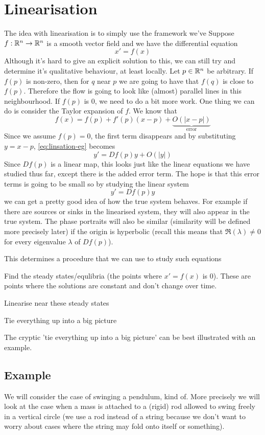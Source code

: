 \section{Linearisation}
The idea with linearisation is to simply use the framework we've 
Suppose $f: \mathbb{R}^n \to \mathbb{R}^n$ is a smooth vector field and we have the differential equation
\begin{equation}\label{eq:linsation-eg}
    x' = f(x)
\end{equation}
Although it's hard to give an explicit solution to this, we can still try and determine it's qualitative behaviour, at least locally. Let $p \in \mathbb{R}^n$ be arbitrary. If $f(p)$ is non-zero, then for $q$ near $p$ we are going to have that $f(q)$ is close to $f(p)$. Therefore the flow is going to look like (almost) parallel lines in this neighbourhood. If $f(p)$ is 0, we need to do a bit more work. One thing we can do is consider the Taylor expansion of $f$. We know that
$$ f(x) = f(p) + f'(p)(x - p) + \underbrace{O(|x - p|)}_{\text{error}} $$
Since we assume $f(p) = 0$, the first term disappears and by substituting $y = x - p$, \autoref{eq:linsation-eg} becomes
$$ y' = Df(p)y + O(|y|) $$
Since $Df(p)$ is a linear map, this looks just like the linear equations we have studied thus far, except there is the added error term. The hope is that this error terms is going to be small so by studying the linear system
$$ y' = Df(p) y $$
we can get a pretty good idea of how the true system behaves. For example if there are sources or sinks in the linearised system, they will also appear in the true system. The phase portraits will also be similar (similarity will be defined more precisely later) if the origin is hyperbolic (recall this means that $\Re(\lambda) \neq 0$ for every eigenvalue $\lambda$ of $Df(p)$).

This determines a procedure that we can use to study such equations
\begin{minenumerate}
    \item Find the steady states/equlibria (the points where $x' = f(x)$ is 0). These are points where the solutions are constant and don't change over time.
    \item Linearise near these steady states
    \item Tie everything up into a big picture
\end{minenumerate}
The cryptic 'tie everything up into a big picture' can be best illustrated with an example.

\subsection{Example}
We will consider the case of swinging a pendulum, kind of. More precisely we will look at the case when a mass is attached to a (rigid) rod allowed to swing freely in a vertical circle (we use a rod instead of a string because we don't want to worry about cases where the string may fold onto itself or something). 

